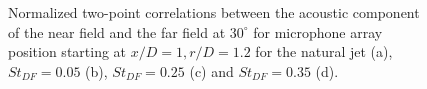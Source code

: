\documentclass[english]{aiaa-tc}
\begin{document}
\begin{figure}
	\begin{centering}

	\end{centering}
	\caption{Normalized two-point correlations between the acoustic component of the near field and the far field at $30^\circ$ for microphone array position starting at $x/D = 1, r/D = 1.2$ for the natural jet (a), $St_{DF} = 0.05$ (b), $St_{DF} = 0.25$ (c) and $St_{DF} = 0.35$ (d).}
	\label{fig:exp_xcorrOA}
\end{figure}
\end{document}
